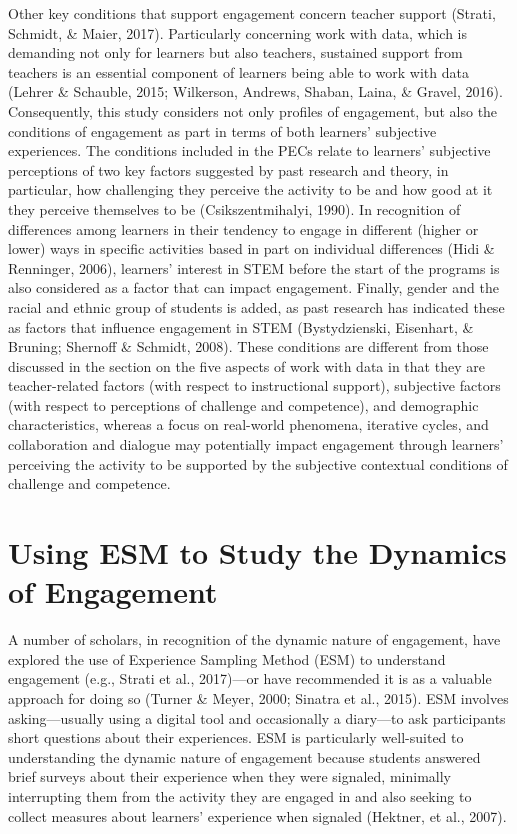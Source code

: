 \documentclass[]{book}
\theoremstyle{definition}
\theoremstyle{definition}
\theoremstyle{definition}
\theoremstyle{remark}
\begin{document}
Other key conditions that support engagement concern teacher support
(Strati, Schmidt, \& Maier, 2017). Particularly concerning work with
data, which is demanding not only for learners but also teachers,
sustained support from teachers is an essential component of learners
being able to work with data (Lehrer \& Schauble, 2015; Wilkerson,
Andrews, Shaban, Laina, \& Gravel, 2016). Consequently, this study
considers not only profiles of engagement, but also the conditions of
engagement as part in terms of both learners' subjective experiences.
The conditions included in the PECs relate to learners' subjective
perceptions of two key factors suggested by past research and theory, in
particular, how challenging they perceive the activity to be and how
good at it they perceive themselves to be (Csikszentmihalyi, 1990). In
recognition of differences among learners in their tendency to engage in
different (higher or lower) ways in specific activities based in part on
individual differences (Hidi \& Renninger, 2006), learners' interest in
STEM before the start of the programs is also considered as a factor
that can impact engagement. Finally, gender and the racial and ethnic
group of students is added, as past research has indicated these as
factors that influence engagement in STEM (Bystydzienski, Eisenhart, \&
Bruning; Shernoff \& Schmidt, 2008). These conditions are different from
those discussed in the section on the five aspects of work with data in
that they are teacher-related factors (with respect to instructional
support), subjective factors (with respect to perceptions of challenge
and competence), and demographic characteristics, whereas a focus on
real-world phenomena, iterative cycles, and collaboration and dialogue
may potentially impact engagement through learners' perceiving the
activity to be supported by the subjective contextual conditions of
challenge and competence.

\section{Using ESM to Study the Dynamics of
Engagement}\label{using-esm-to-study-the-dynamics-of-engagement}

A number of scholars, in recognition of the dynamic nature of
engagement, have explored the use of Experience Sampling Method (ESM) to
understand engagement (e.g., Strati et al., 2017)---or have recommended
it is as a valuable approach for doing so (Turner \& Meyer, 2000;
Sinatra et al., 2015). ESM involves asking---usually using a digital
tool and occasionally a diary---to ask participants short questions
about their experiences. ESM is particularly well-suited to
understanding the dynamic nature of engagement because students answered
brief surveys about their experience when they were signaled, minimally
interrupting them from the activity they are engaged in and also seeking
to collect measures about learners' experience when signaled (Hektner,
et al., 2007).
\end{document}
